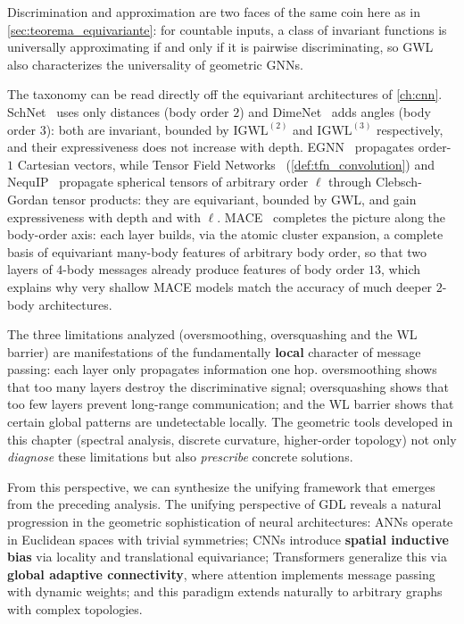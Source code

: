 Discrimination and approximation are two faces of the same coin here as in \autoref{sec:teorema_equivariante}: for countable inputs, a class of invariant functions is universally approximating if and only if it is pairwise discriminating, so GWL also characterizes the universality of geometric \glspl{GNN}.

\begin{remark}\label{rem:gwl_arquitecturas}
	The taxonomy can be read directly off the equivariant architectures of \autoref{ch:cnn}. SchNet~\citep{schutt2017schnet} uses only distances (body order $2$) and DimeNet~\citep{gasteiger2020dimenet} adds angles (body order $3$): both are invariant, bounded by $\mathrm{IGWL}^{(2)}$ and $\mathrm{IGWL}^{(3)}$ respectively, and their expressiveness does not increase with depth. EGNN~\citep{satorras2021enequivariant} propagates order-$1$ Cartesian vectors, while Tensor Field Networks~\citep{thomas2018tensorfieldnetworks} (\autoref{def:tfn_convolution}) and NequIP~\citep{batzner2022nequip} propagate spherical tensors of arbitrary order $\ell$ through Clebsch-Gordan tensor products: they are equivariant, bounded by GWL, and gain expressiveness with depth and with $\ell$. MACE~\citep{batatia2022mace} completes the picture along the body-order axis: each layer builds, via the atomic cluster expansion, a complete basis of equivariant many-body features of arbitrary body order, so that two layers of $4$-body messages already produce features of body order $13$, which explains why very shallow MACE models match the accuracy of much deeper $2$-body architectures.
\end{remark}

\medskip

The three limitations analyzed (\gls{oversmoothing}, \gls{oversquashing} and the WL barrier) are manifestations of the fundamentally \textbf{local} character of message passing: each layer only propagates information one hop. \gls{oversmoothing} shows that too many layers destroy the discriminative signal; \gls{oversquashing} shows that too few layers prevent long-range communication; and the WL barrier shows that certain global patterns are undetectable locally. The geometric tools developed in this chapter (spectral analysis, discrete curvature, higher-order topology) not only \textit{diagnose} these limitations but also \textit{prescribe} concrete solutions.

From this perspective, we can synthesize the unifying framework that emerges from the preceding analysis. The unifying perspective of \gls{GDL} reveals a natural progression in the geometric sophistication of neural architectures: \glspl{ANN} operate in Euclidean spaces with trivial symmetries; \glspl{CNN} introduce \textbf{spatial inductive bias} via locality and translational equivariance; \glspl{Transformer} generalize this via \textbf{global adaptive connectivity}, where attention implements message passing with dynamic weights; and this paradigm extends naturally to arbitrary graphs with complex topologies.

